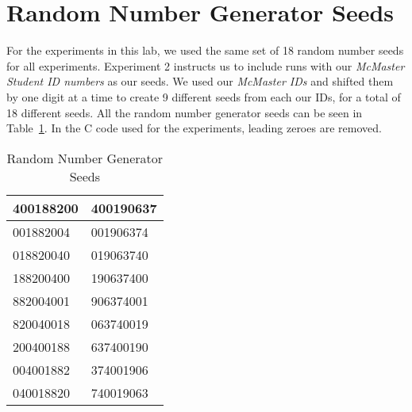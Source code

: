 \section*{Random Number Generator Seeds}
For the experiments in this lab, we used the same set of 18 random number seeds for all experiments. Experiment 2 instructs us to include runs with our \textit{McMaster Student ID numbers} as our seeds. We used our \textit{McMaster IDs} and shifted them by one digit at a time to create 9 different seeds from each our IDs, for a total of 18 different seeds. All the random number generator seeds can be seen in Table~\ref{tab:random_seeds}. In the C code used for the experiments, leading zeroes are removed.

\begin{table}[h]
	\centering
	\begin{tabular}{|l|l|}
	\hline
	400188200 & 400190637 \\ \hline
	001882004 & 001906374 \\ \hline
	018820040 & 019063740 \\ \hline
	188200400 & 190637400 \\ \hline
	882004001 & 906374001 \\ \hline
	820040018 & 063740019 \\ \hline
	200400188 & 637400190 \\ \hline
	004001882 & 374001906 \\ \hline
	040018820 & 740019063 \\ \hline
	\end{tabular}
\caption{Random Number Generator Seeds}
\label{tab:random_seeds}
\end{table}